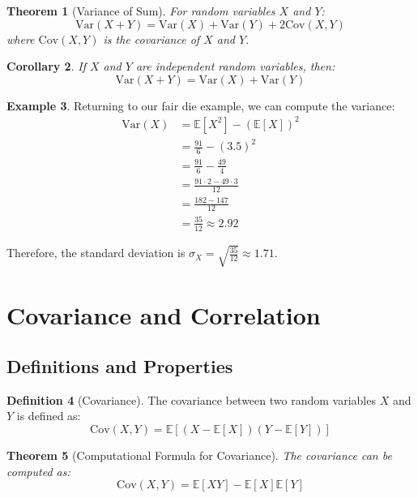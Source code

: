 \documentclass[12pt,a4paper]{article}
\theoremstyle{plain}
\newtheorem{theorem}{Theorem}[section]
\newtheorem{corollary}[theorem]{Corollary}
\theoremstyle{definition}
\newtheorem{definition}[theorem]{Definition}
\newtheorem{example}[theorem]{Example}
\begin{document}
\begin{theorem}[Variance of Sum]
For random variables $X$ and $Y$:
\begin{equation}
\text{Var}(X + Y) = \text{Var}(X) + \text{Var}(Y) + 2\text{Cov}(X, Y)
\end{equation}
where $\text{Cov}(X, Y)$ is the covariance of $X$ and $Y$.
\end{theorem}

\begin{corollary}
If $X$ and $Y$ are independent random variables, then:
\begin{equation}
\text{Var}(X + Y) = \text{Var}(X) + \text{Var}(Y)
\end{equation}
\end{corollary}

\begin{example}
Returning to our fair die example, we can compute the variance:
\begin{align*}
\text{Var}(X) &= \mathbb{E}[X^2] - (\mathbb{E}[X])^2\\
&= \frac{91}{6} - \left(3.5\right)^2\\
&= \frac{91}{6} - \frac{49}{4}\\
&= \frac{91 \cdot 2 - 49 \cdot 3}{12}\\
&= \frac{182 - 147}{12}\\
&= \frac{35}{12} \approx 2.92
\end{align*}

Therefore, the standard deviation is $\sigma_X = \sqrt{\frac{35}{12}} \approx 1.71$.
\end{example}

\section{Covariance and Correlation}

\subsection{Definitions and Properties}

\begin{definition}[Covariance]
The covariance between two random variables $X$ and $Y$ is defined as:
\begin{equation}
\text{Cov}(X, Y) = \mathbb{E}[(X - \mathbb{E}[X])(Y - \mathbb{E}[Y])]
\end{equation}
\end{definition}

\begin{theorem}[Computational Formula for Covariance]
The covariance can be computed as:
\begin{equation}
\text{Cov}(X, Y) = \mathbb{E}[XY] - \mathbb{E}[X]\mathbb{E}[Y]
\end{equation}
\end{theorem}
\end{document}
